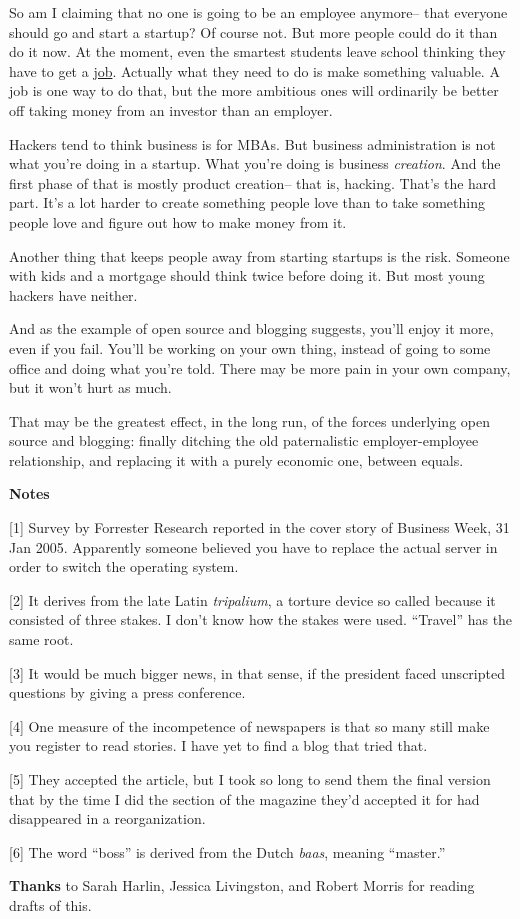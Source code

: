 So am I claiming that no one is going to be an employee anymore-- that
everyone should go and start a startup? Of course not. But more people
could do it than do it now. At the moment, even the smartest students
leave school thinking they have to get a \href{hiring.html}{job}.
Actually what they need to do is make something valuable. A job is one
way to do that, but the more ambitious ones will ordinarily be better
off taking money from an investor than an employer.

Hackers tend to think business is for MBAs. But business administration
is not what you're doing in a startup. What you're doing is business
\emph{creation}. And the first phase of that is mostly product
creation-- that is, hacking. That's the hard part. It's a lot harder to
create something people love than to take something people love and
figure out how to make money from it.

Another thing that keeps people away from starting startups is the risk.
Someone with kids and a mortgage should think twice before doing it. But
most young hackers have neither.

And as the example of open source and blogging suggests, you'll enjoy it
more, even if you fail. You'll be working on your own thing, instead of
going to some office and doing what you're told. There may be more pain
in your own company, but it won't hurt as much.

That may be the greatest effect, in the long run, of the forces
underlying open source and blogging: finally ditching the old
paternalistic employer-employee relationship, and replacing it with a
purely economic one, between equals.

\textbf{Notes}

{[}1{]} Survey by Forrester Research reported in the cover story of
Business Week, 31 Jan 2005. Apparently someone believed you have to
replace the actual server in order to switch the operating system.

{[}2{]} It derives from the late Latin \emph{tripalium}, a torture
device so called because it consisted of three stakes. I don't know how
the stakes were used. ``Travel'' has the same root.

{[}3{]} It would be much bigger news, in that sense, if the president
faced unscripted questions by giving a press conference.

{[}4{]} One measure of the incompetence of newspapers is that so many
still make you register to read stories. I have yet to find a blog that
tried that.

{[}5{]} They accepted the article, but I took so long to send them the
final version that by the time I did the section of the magazine they'd
accepted it for had disappeared in a reorganization.

{[}6{]} The word ``boss'' is derived from the Dutch \emph{baas}, meaning
``master.''

\textbf{Thanks} to Sarah Harlin, Jessica Livingston, and Robert Morris
for reading drafts of this.
